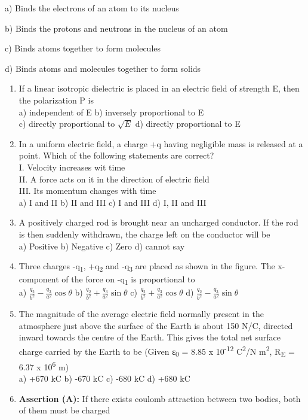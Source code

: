 a) Binds the electrons of an atom to its nucleus

b) Binds the protons and neutrons in the nucleus of an atom

c) Binds atoms together to form molecules

d) Binds atoms and molecules together to form solids

\begin{enumerate}
\def\labelenumi{\arabic{enumi}.}
\setcounter{enumi}{32}
\item
  If a linear isotropic dielectric is placed in an electric field of
  strength E, then the polarization P is\\
  a) independent of E b) inversely proportional to E\\
  c) directly proportional to \(\sqrt{E}\) d) directly proportional to E
\item
  In a uniform electric field, a charge +q having negligible mass is
  released at a point. Which of the following statements are correct?\\
  I. Velocity increases wit time\\
  II. A force acts on it in the direction of electric field\\
  III. Its momentum changes with time\\
  a) I and II b) II and III c) I and III d) I, II and III
\item
  A positively charged rod is brought near an uncharged conductor. If
  the rod is then suddenly withdrawn, the charge left on the conductor
  will be\\
  a) Positive b) Negative c) Zero d) cannot say
\item
  Three charges -q\textsubscript{1}, +q\textsubscript{2} and
  -q\textsubscript{3} are placed as shown in the figure. The x-component
  of the force on -q\textsubscript{1} is proportional to\\
  a) \(\frac{q_{2}}{b^{2}} - \frac{q_{3}}{a^{2}}\cos\theta\) b)
  \(\frac{q_{2}}{b^{2}} + \frac{q_{3}}{a^{2}}\sin\theta\) c)
  \(\frac{q_{2}}{b^{2}} + \frac{q_{3}}{a^{2}}\cos\theta\) d)
  \(\frac{q_{2}}{b^{2}} - \frac{q_{3}}{a^{2}}\sin\theta\)
\item
  The magnitude of the average electric field normally pres­ent in the
  atmosphere just above the surface of the Earth is about 150 N/C,
  directed inward towards the centre of the Earth. This gives the total
  net surface charge car­ried by the Earth to be (Given
  ε\textsubscript{0} = 8.85 x 10\textsuperscript{-12}
  C\textsuperscript{2}/N m\textsuperscript{2}, R\textsubscript{E} = 6.37
  x 10\textsuperscript{6} m)\\
  a) +670 kC b) -670 kC c) -680 kC d) +680 kC
\item
  \textbf{Assertion (A):} If there exists coulomb attraction between two
  bodies, both of them must be charged
\end{enumerate}

